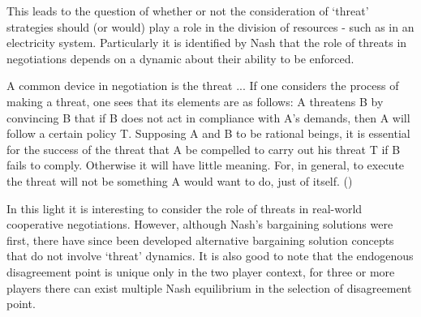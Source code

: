 This leads to the question of whether or not the consideration of `threat' strategies should (or would) play a role in the division of resources - such as in an electricity system.
Particularly it is identified by Nash that the role of threats in negotiations depends on a dynamic about their ability to be enforced.

\begin{displayquote}
A common device in negotiation is the threat ... If one considers the process of making a threat, one sees that its elements are as follows: A threatens B by convincing B that if B does not act in compliance with A's demands, then A will follow a certain policy T. Supposing A and B to be rational beings, it is essential for the success of the threat that A be compelled to carry out his threat T if B fails to comply. Otherwise it will have little meaning. For, in general, to execute the threat will not be something A would want to do, just of itself.
(\cite{nash2})
\end{displayquote}

In this light it is interesting to consider the role of threats in real-world cooperative negotiations. However, although Nash's bargaining solutions were first, there have since been developed alternative bargaining solution concepts that do not involve `threat' dynamics. \cite{bozbay}
It is also good to note that the endogenous disagreement point is unique only in the two player context, for three or more players there can exist multiple Nash equilibrium in the selection of disagreement point.\cite{10.2307/43616981}

